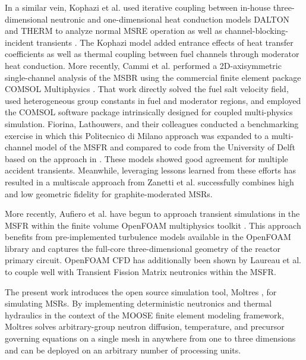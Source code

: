 \documentclass{article}
\begin{document}
In a similar vein, Kophazi et al. used iterative coupling between in-house
three-dimensional neutronic and one-dimensional heat conduction models DALTON
and THERM to analyze normal \gls{MSRE} operation as well as
channel-blocking-incident transients \cite{kophazi_development_2009}. The
Kophazi model added entrance effects of heat transfer coefficients as well as
thermal coupling between fuel channels through moderator heat conduction. More
recently, Cammi et al. performed a 2D-axisymmetric single-channel analysis of
the \gls{MSBR} using the commercial finite element package COMSOL Multiphysics
\cite{cammi_multi-physics_2011}. That work directly solved the fuel salt
velocity field, used heterogeneous group constants in fuel and moderator
regions, and employed the \gls{COMSOL} software package intrinsically designed
for coupled multi-physics simulation.  Fiorina, Lathouwers, and their
colleagues conducted a benchmarking exercise \cite{fiorina_modelling_2014} in
which this Politecnico di Milano approach was expanded to a multi-channel model
of the \gls{MSFR} and compared to code from the University of Delft
\cite{de_zwaan_static_2007,van_der_linden_coupled_2012} based on the approach in
\cite{kophazi_development_2009}. These models showed good agreement for
multiple accident transients. Meanwhile, leveraging lessons learned from these
efforts has resulted in a multiscale approach from Zanetti et al.
\cite{zanetti_geometric_2015} successfully combines high and low geometric
fidelity for graphite-moderated \glspl{MSR}.

More recently, Aufiero et al. \cite{aufiero_development_2014} have begun to
approach transient simulations in the \gls{MSFR} within the finite volume
OpenFOAM multiphysics toolkit \cite{weller_tensorial_1998}.  This approach
benefits from pre-implemented turbulence models available in the OpenFOAM
library and captures the full-core three-dimensional geometry of the reactor
primary circuit.  OpenFOAM \gls{CFD} has additionally been shown by Laureau et
al. \cite{laureau_transient_2017} to couple well with Transient Fission Matrix
neutronics within the \gls{MSFR}.

The present work introduces the open source simulation tool, Moltres
\cite{lindsay_moltres_2017}, for simulating \glspl{MSR}.  By implementing
deterministic neutronics and thermal hydraulics in the context of the
\gls{MOOSE} finite element modeling framework, Moltres solves arbitrary-group
neutron diffusion, temperature, and precursor governing equations on a single
mesh in anywhere from one to three dimensions and can be deployed on an
arbitrary number of processing units.
\end{document}
